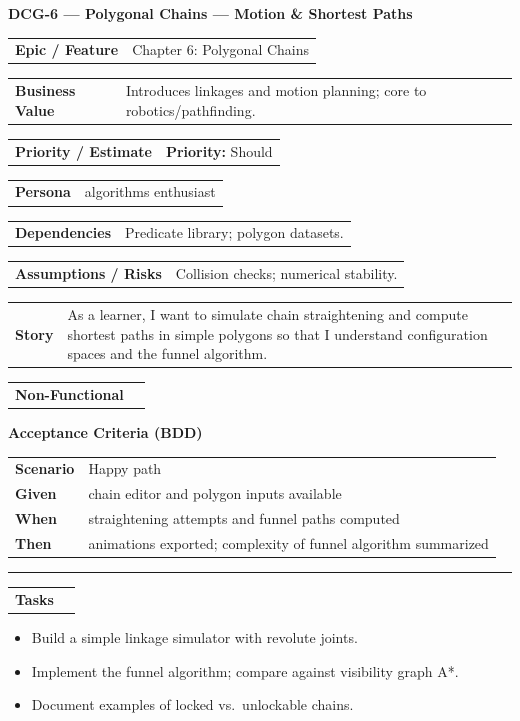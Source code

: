 \documentclass[11pt,a4paper]{article}
\makeatletter
\newcommand{\FieldRow}[2]{%
  \noindent\begin{tabularx}{\linewidth}{@{}>{\bfseries}l X@{}}#1 & #2\\\end{tabularx}%
}
\newcommand{\CardDivider}{\par\noindent\color{CardBorder}\rule{\linewidth}{0.4pt}\par\noindent\color{black}}
\newcommand{\StoryHeader}[2]{%
  {\large\bfseries \textcolor{CardTitle}{#1} --- #2}
}
\newcommand{\BDD}[4]{%
  \par\noindent\textbf{Acceptance Criteria (BDD)}\par\nobreak
  \noindent\begin{tabularx}{\linewidth}{@{}>{\bfseries}l X@{}}
  Scenario & #1\\
  Given & #2\\
  When & #3\\
  Then & #4\\
  \end{tabularx}\par
}
\newenvironment{TaskList}{%
  \begin{itemize}[leftmargin=1.25em,label=\(\square\)]
}{\end{itemize}}
\makeatother
\begin{document}
\begin{StoryCardBox}
\StoryHeader{DCG-6}{Polygonal Chains — Motion \& Shortest Paths}\\[0.4em]
\FieldRow{Epic / Feature}{Chapter 6: Polygonal Chains}
\FieldRow{Business Value}{Introduces linkages and motion planning; core to robotics/pathfinding.}
\FieldRow{Priority / Estimate}{\textbf{Priority:} Should \quad \nfchip{SP: 5}}
\FieldRow{Persona}{algorithms enthusiast}
\FieldRow{Dependencies}{Predicate library; polygon datasets.}
\FieldRow{Assumptions / Risks}{Collision checks; numerical stability.}
\FieldRow{Story}{As a learner, I want to simulate chain straightening and compute shortest paths in simple polygons so that I understand configuration spaces and the funnel algorithm.}

\FieldRow{Non-Functional}{\nfchip{Clarity} \nfchip{Performance} \nfchip{Reproducibility}}

\BDD{Happy path}{chain editor and polygon inputs available}{straightening attempts and funnel paths computed}{animations exported; complexity of funnel algorithm summarized}

\CardDivider
\FieldRow{\large Tasks}{}
\begin{TaskList}
  \item Build a simple linkage simulator with revolute joints.
  \item Implement the funnel algorithm; compare against visibility graph A*.
  \item Document examples of locked vs.\ unlockable chains.
\end{TaskList}
\end{StoryCardBox}
\end{document}
